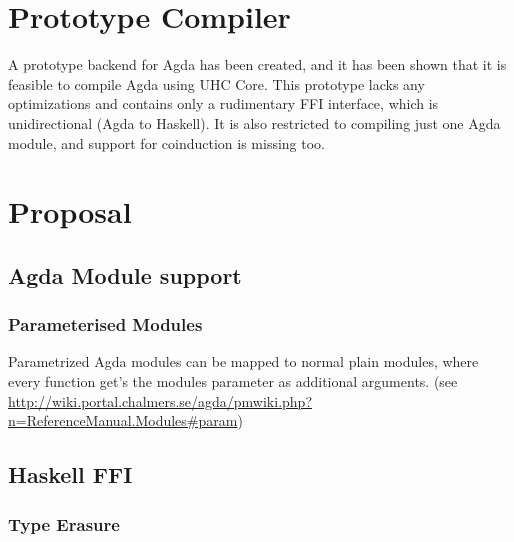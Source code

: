 \documentclass[12pt, a4paper, twoside]{report}
\begin{document}
\chapter{Prototype Compiler}
A prototype backend for Agda has been created, and it has been shown that it is feasible to compile
Agda using UHC Core. This prototype lacks any optimizations and contains only a rudimentary FFI
interface, which is unidirectional (Agda to Haskell). It is also restricted to compiling just one
Agda module, and support for coinduction is missing too.

\chapter{Proposal}
\section{Agda Module support}
\subsection{Parameterised Modules}
Parametrized Agda modules can be mapped to normal plain modules, where every function get's the
modules parameter as additional arguments. (see \url{http://wiki.portal.chalmers.se/agda/pmwiki.php?n=ReferenceManual.Modules#param})

\section{Haskell FFI}
\subsection{Type Erasure}
\end{document}
